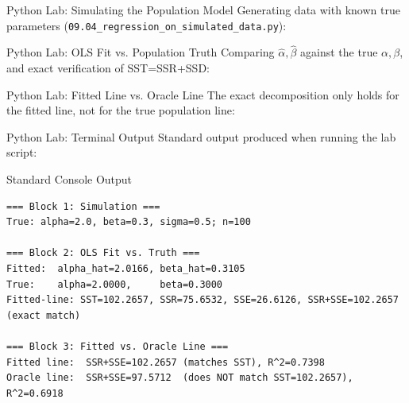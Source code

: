 \documentclass[10pt, aspectratio=169]{beamer}
\begin{document}
\begin{frame}[fragile]{Python Lab: Simulating the Population Model}
  \scriptsize
  Generating data with known true parameters (\texttt{09.04\_regression\_on\_simulated\_data.py}):
  {
  }
\end{frame}

\begin{frame}[fragile]{Python Lab: OLS Fit vs. Population Truth}
  \scriptsize
  Comparing $\hat\alpha,\hat\beta$ against the true $\alpha,\beta$, and exact verification of SST=SSR+SSD:
  {
  }
\end{frame}

\begin{frame}[fragile]{Python Lab: Fitted Line vs. Oracle Line}
  \scriptsize
  The exact decomposition only holds for the fitted line, not for the true population line:
  {
  }
\end{frame}

\begin{frame}[fragile]{Python Lab: Terminal Output}
  \scriptsize
  Standard output produced when running the lab script:
  \vspace{0.02cm}
  \begin{block}{Standard Console Output}
    \fontsize{3.6pt}{4.3pt}\selectfont
    \begin{verbatim}
=== Block 1: Simulation ===
True: alpha=2.0, beta=0.3, sigma=0.5; n=100

=== Block 2: OLS Fit vs. Truth ===
Fitted:  alpha_hat=2.0166, beta_hat=0.3105
True:    alpha=2.0000,     beta=0.3000
Fitted-line: SST=102.2657, SSR=75.6532, SSE=26.6126, SSR+SSE=102.2657 (exact match)

=== Block 3: Fitted vs. Oracle Line ===
Fitted line:  SSR+SSE=102.2657 (matches SST), R^2=0.7398
Oracle line:  SSR+SSE=97.5712  (does NOT match SST=102.2657), R^2=0.6918
    \end{verbatim}
  \end{block}
\end{frame}
\end{document}
